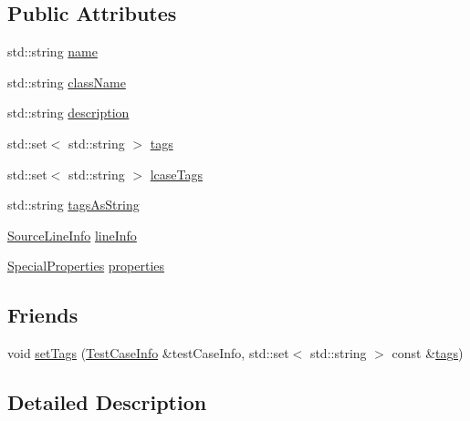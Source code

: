 \subsection*{Public Attributes}
\begin{DoxyCompactItemize}
\item 
std\+::string \hyperlink{struct_catch_1_1_test_case_info_a463794e2f5cfead307c93efd134ade36}{name}
\item 
std\+::string \hyperlink{struct_catch_1_1_test_case_info_a1a5e0825132a38d091defdebbf2f8ce9}{class\+Name}
\item 
std\+::string \hyperlink{struct_catch_1_1_test_case_info_a37fe2db9425bc45f6a33893eac31198e}{description}
\item 
std\+::set$<$ std\+::string $>$ \hyperlink{struct_catch_1_1_test_case_info_a045f62e7719a8760a5b456f7fd2dc97c}{tags}
\item 
std\+::set$<$ std\+::string $>$ \hyperlink{struct_catch_1_1_test_case_info_a0ed3864a313e8ddc3ae38431be5be9ae}{lcase\+Tags}
\item 
std\+::string \hyperlink{struct_catch_1_1_test_case_info_ac65c2d36fd36f71e9bf782b2ea245c64}{tags\+As\+String}
\item 
\hyperlink{struct_catch_1_1_source_line_info}{Source\+Line\+Info} \hyperlink{struct_catch_1_1_test_case_info_aa9407b7f442655b51a2aad24b3fa2fd3}{line\+Info}
\item 
\hyperlink{struct_catch_1_1_test_case_info_a39b232f74b4a7a6f2183b96759027eac}{Special\+Properties} \hyperlink{struct_catch_1_1_test_case_info_afc1e84bd7a2e180895a06d9131302af0}{properties}
\end{DoxyCompactItemize}
\subsection*{Friends}
\begin{DoxyCompactItemize}
\item 
void \hyperlink{struct_catch_1_1_test_case_info_addc10c770e56f49da5baa0c76cf25bd5}{set\+Tags} (\hyperlink{struct_catch_1_1_test_case_info}{Test\+Case\+Info} \&test\+Case\+Info, std\+::set$<$ std\+::string $>$ const \&\hyperlink{struct_catch_1_1_test_case_info_a045f62e7719a8760a5b456f7fd2dc97c}{tags})
\end{DoxyCompactItemize}


\subsection{Detailed Description}


